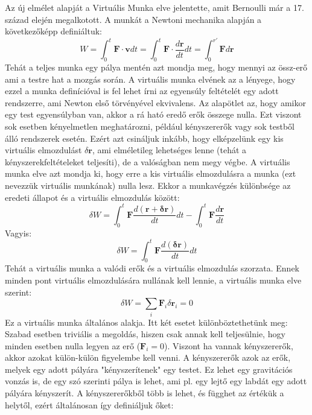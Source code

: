 \documentclass[../main.tex]{subfiles}
\begin{document}
Az új elmélet alapját a Virtuális Munka elve jelentette, amit Bernoulli már a 17. század elején megalkotott. A munkát a Newtoni mechanika alapján a következőképp definiáltuk:
\begin{equation}
    W = \int_0^{t} \mathbf{F} \cdot \mathbf{v} dt = \int_0^{t} \mathbf{F} \cdot \frac{d\mathbf{r}}{dt} dt = \int_0^{r'} \mathbf{F} d\mathbf{r} 
\end{equation}
Tehát a teljes munka egy pálya mentén azt mondja meg, hogy mennyi az össz-erő ami a testre hat a mozgás során. A virtuális munka elvének az a lényege, hogy ezzel a munka definícióval is fel lehet írni az egyensúly feltételét egy adott rendszerre, ami Newton első törvényével ekvivalens. Az alapötlet az, hogy amikor egy test egyensúlyban van, akkor a rá ható eredő erők összege nulla. Ezt viszont sok esetben kényelmetlen meghatározni, például kényszererők vagy sok testből álló rendszerek esetén. Ezért azt csináljuk inkább, hogy elképzelünk egy kis virtuális elmozdulást $\delta \mathbf{r}$, ami elméletileg lehetséges lenne (tehát a kényszerekfeltételeket teljesíti), de a valóságban nem megy végbe. A virtuális munka elve azt mondja ki, hogy erre a kis virtuális elmozdulásra a munka (ezt nevezzük virtuális munkának) nulla lesz. Ekkor a munkavégzés különbsége az eredeti állapot és a virtuális elmozdulás között:
\begin{equation}
    \delta W = \int_0^{t} \mathbf{F} \frac{d(\mathbf{r} + \mathbf{\delta r})}{dt} dt - \int_0^t \mathbf{F} \frac{d\mathbf{r}}{dt}
\end{equation}
Vagyis:
\begin{equation}
    \delta W = \int_0^{t} \mathbf{F} \frac{d(\mathbf{\delta r})}{dt} dt
\end{equation}
Tehát a virtuális munka a valódi erők és a virtuális elmozdulás szorzata. Ennek minden pont virtuális elmozdulására nullának kell lennie, a virtuális munka elve szerint:
\begin{equation}
    \delta W = \sum_i \mathbf{F}_i \delta \mathbf{r}_i = 0
\end{equation}
Ez a virtuális munka általános alakja. Itt két esetet különböztethetünk meg: Szabad esetben triviális a megoldás, hiszen csak annak kell teljesülnie, hogy minden esetben nulla legyen az erő ($\mathbf{F}_i = 0$). Viszont ha vannak kényszererők, akkor azokat külön-külön figyelembe kell venni. A kényszererők azok az erők, melyek egy adott pályára "kényszerítenek" egy testet. Ez lehet egy gravitációs vonzás is, de egy szó szerinti pálya is lehet, ami pl. egy lejtő egy labdát egy adott pályára kényszerít. A kényszererőkből több is lehet, és függhet az értékük a helytől, ezért általánosan így definiáljuk őket:
\end{document}

